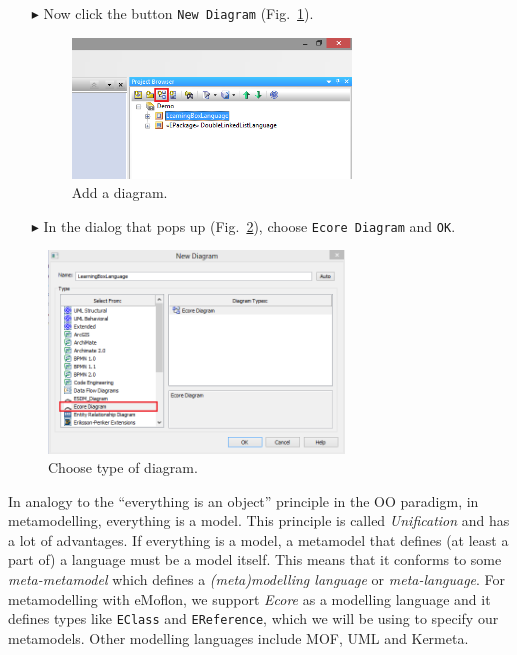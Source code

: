 \begin{enumerate}
\item[$\blacktriangleright$] Now click the button \texttt{New Diagram} (Fig.~\ref{fig:diagram}).


\begin{figure}[htbp]
	\centering
  \includegraphics[width=0.7\textwidth]{pics/memBoxBilder/memBox04.png}
	\caption{Add a diagram.}
	\label{fig:diagram}
\end{figure}

\item[$\blacktriangleright$] In the dialog that pops up (Fig.~\ref{fig:diagram_type}), choose \texttt{Ecore Diagram} and  \texttt{OK}.
\end{enumerate}

\begin{figure}[htbp]
	\centering
  \includegraphics[width=0.7\textwidth]{pics/memBoxBilder/memBox05.png}
	\caption{Choose type of diagram.}
	\label{fig:diagram_type}
\end{figure}

In analogy to the ``everything is an object'' principle in the OO paradigm, in metamodelling, everything is a model.
This principle is called \emph{Unification} and has a lot of advantages.
If everything is a model, a metamodel that defines (at least a part of) a language must be a model itself.
This means that it conforms to some \emph{meta-metamodel} which defines a \emph{(meta)modelling language} or \emph{meta-language}.
For metamodelling with eMoflon, we support \emph{Ecore} as a modelling language and it defines types like \texttt{EClass} and \texttt{EReference}, which we will be using to specify  our metamodels.
Other modelling languages include MOF, UML and Kermeta.

